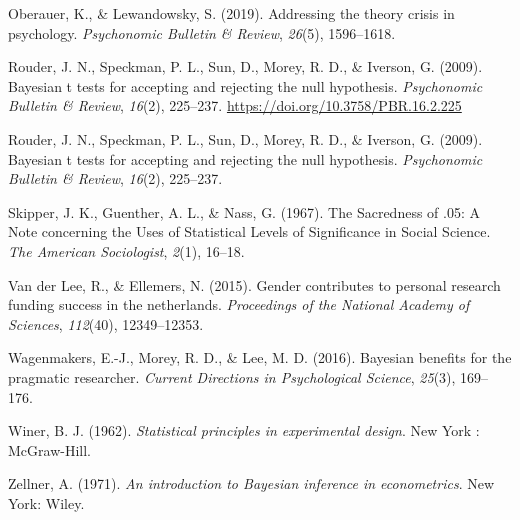\documentclass[
  english,
  ,jou,floatsintext]{apa6}
\newlength{\cslhangindent}
\newenvironment{cslreferences}%
  {\setlength{\parindent}{0pt}%
  \everypar{\setlength{\hangindent}{\cslhangindent}}\ignorespaces}%
  {\par}
\begin{document}
\begin{cslreferences}
\leavevmode\hypertarget{ref-oberauer2019addressing}{}%
Oberauer, K., \& Lewandowsky, S. (2019). Addressing the theory crisis in psychology. \emph{Psychonomic Bulletin \& Review}, \emph{26}(5), 1596--1618.

\leavevmode\hypertarget{ref-rouder_bayesian_2009}{}%
Rouder, J. N., Speckman, P. L., Sun, D., Morey, R. D., \& Iverson, G. (2009). Bayesian t tests for accepting and rejecting the null hypothesis. \emph{Psychonomic Bulletin \& Review}, \emph{16}(2), 225--237. \url{https://doi.org/10.3758/PBR.16.2.225}

\leavevmode\hypertarget{ref-rouder2009bayesian}{}%
Rouder, J. N., Speckman, P. L., Sun, D., Morey, R. D., \& Iverson, G. (2009). Bayesian t tests for accepting and rejecting the null hypothesis. \emph{Psychonomic Bulletin \& Review}, \emph{16}(2), 225--237.

\leavevmode\hypertarget{ref-skipper_sacredness_1967}{}%
Skipper, J. K., Guenther, A. L., \& Nass, G. (1967). The Sacredness of .05: A Note concerning the Uses of Statistical Levels of Significance in Social Science. \emph{The American Sociologist}, \emph{2}(1), 16--18.

\leavevmode\hypertarget{ref-van2015gender}{}%
Van der Lee, R., \& Ellemers, N. (2015). Gender contributes to personal research funding success in the netherlands. \emph{Proceedings of the National Academy of Sciences}, \emph{112}(40), 12349--12353.

\leavevmode\hypertarget{ref-wagenmakers2016bayesian}{}%
Wagenmakers, E.-J., Morey, R. D., \& Lee, M. D. (2016). Bayesian benefits for the pragmatic researcher. \emph{Current Directions in Psychological Science}, \emph{25}(3), 169--176.

\leavevmode\hypertarget{ref-winer_statistical_1962}{}%
Winer, B. J. (1962). \emph{Statistical principles in experimental design}. New York : McGraw-Hill.

\leavevmode\hypertarget{ref-zellner_introduction_1971}{}%
Zellner, A. (1971). \emph{An introduction to Bayesian inference in econometrics}. New York: Wiley.
\end{cslreferences}
\end{document}

